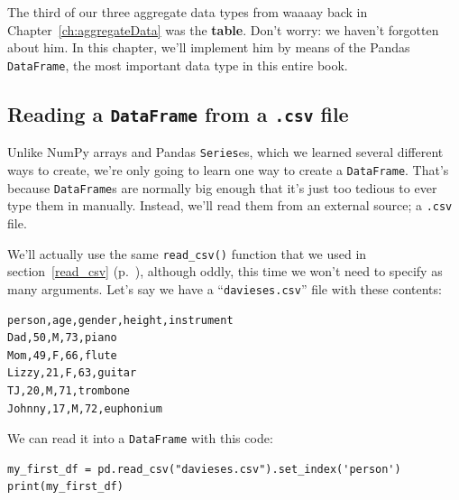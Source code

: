 
\chapter[Tables in Python (1 of 3)]{\huge\selectfont{Tables in Python (1 of
3)}}

\label{tablesInPython1}
\label{dataframes}


The third of our three aggregate data types from waaaay back in
Chapter~\ref{ch:aggregateData} was the \textbf{table}. Don't worry: we haven't
forgotten about him. In this chapter, we'll implement him by means of the
Pandas \texttt{DataFrame}, the most important data type in this entire book.

\section{Reading a \texttt{DataFrame} from a \texttt{.csv} file}


Unlike NumPy arrays and Pandas \texttt{Series}es, which we learned several
different ways to create, we're only going to learn one way to create a
\texttt{DataFrame}. That's because \texttt{DataFrame}s are normally big enough
that it's just too tedious to ever type them in manually. Instead, we'll read
them from an external source; a \texttt{.csv} file.


We'll actually use the same \texttt{read\_csv()} function that we used in
section~\ref{read_csv} (p.~\pageref{read_csv}), although oddly, this time we
won't need to specify as many arguments. Let's say we have a
``\texttt{davieses.csv}'' file with these contents:

\vspace{-.2in}

\begin{Verbatim}[fontsize=\small,samepage=true,frame=lines,framesep=3mm]
person,age,gender,height,instrument
Dad,50,M,73,piano
Mom,49,F,66,flute
Lizzy,21,F,63,guitar
TJ,20,M,71,trombone
Johnny,17,M,72,euphonium
\end{Verbatim}

We can read it into a \texttt{DataFrame} with this code:

\begin{Verbatim}[fontsize=\footnotesize,samepage=true,frame=single,framesep=3mm]
my_first_df = pd.read_csv("davieses.csv").set_index('person')
print(my_first_df)
\end{Verbatim}
\vspace{-.2in}

